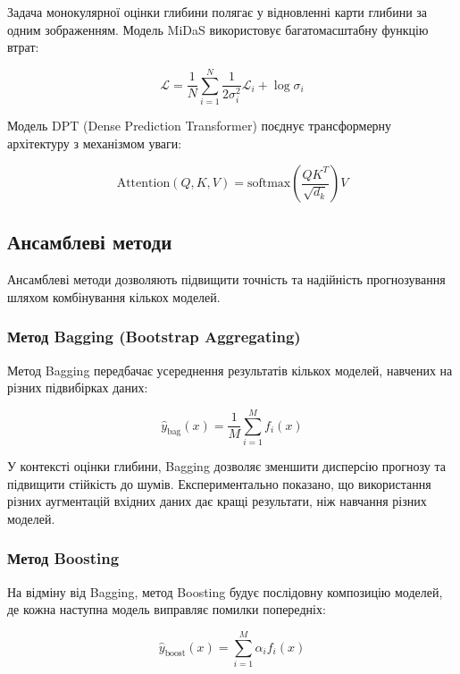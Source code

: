 \documentclass[14pt, a4paper]{extarticle}
\numberwithin{equation}{section}
\begin{document}
Задача монокулярної оцінки глибини полягає у відновленні карти глибини за одним зображенням. Модель MiDaS \cite{ranftl2020towards} використовує багатомасштабну функцію втрат:

\begin{equation}
\mathcal{L} = \frac{1}{N} \sum_{i=1}^N \frac{1}{2\sigma_i^2} \mathcal{L}_i + \log \sigma_i \tag{34}
\end{equation}

Модель DPT (Dense Prediction Transformer) \cite{ranftl2021vision} поєднує трансформерну архітектуру з механізмом уваги:

\begin{equation}
\text{Attention}(Q, K, V) = \text{softmax}\left(\frac{QK^T}{\sqrt{d_k}}\right)V \tag{57}
\end{equation}

\subsection{Ансамблеві методи}

Ансамблеві методи дозволяють підвищити точність та надійність прогнозування шляхом комбінування кількох моделей.

\subsubsection{Метод Bagging (Bootstrap Aggregating)}

Метод Bagging передбачає усереднення результатів кількох моделей, навчених на різних підвибірках даних:

\begin{equation}
\hat{y}_{\text{bag}}(x) = \frac{1}{M} \sum_{i=1}^{M} f_i(x) \tag{53}
\end{equation}

У контексті оцінки глибини, Bagging дозволяє зменшити дисперсію прогнозу та підвищити стійкість до шумів. Експериментально показано, що використання різних аугментацій вхідних даних дає кращі результати, ніж навчання різних моделей.

\subsubsection{Метод Boosting}

На відміну від Bagging, метод Boosting будує послідовну композицію моделей, де кожна наступна модель виправляє помилки попередніх:

\begin{equation}
\hat{y}_{\text{boost}}(x) = \sum_{i=1}^{M} \alpha_i f_i(x) \tag{54}
\end{equation}
\end{document}
